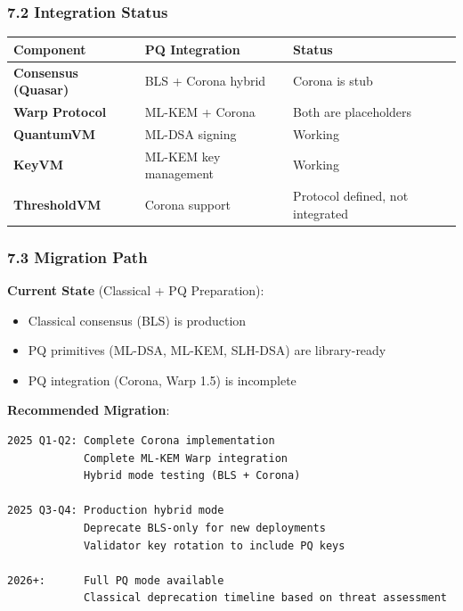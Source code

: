 \documentclass[
]{article}
\newcounter{none} %
\providecommand{\tightlist}{%
  \setlength{\itemsep}{0pt}\setlength{\parskip}{0pt}}
\begin{document}
\subsubsection{7.2 Integration Status}\label{72-integration-status}

{\def\LTcaptype{none} %
\begin{longtable}[]{@{}lll@{}}
\toprule\noalign{}
Component & PQ Integration & Status \\
\midrule\noalign{}
\endhead
\bottomrule\noalign{}
\endlastfoot
\textbf{Consensus (Quasar)} & BLS + Corona hybrid & Corona is
stub \\
\textbf{Warp Protocol} & ML-KEM + Corona & Both are placeholders \\
\textbf{QuantumVM} & ML-DSA signing & Working \\
\textbf{KeyVM} & ML-KEM key management & Working \\
\textbf{ThresholdVM} & Corona support & Protocol defined, not
integrated \\
\end{longtable}
}

\subsubsection{7.3 Migration Path}\label{73-migration-path}

\textbf{Current State} (Classical + PQ Preparation):

\begin{itemize}
\tightlist
\item
  Classical consensus (BLS) is production
\item
  PQ primitives (ML-DSA, ML-KEM, SLH-DSA) are library-ready
\item
  PQ integration (Corona, Warp 1.5) is incomplete
\end{itemize}

\textbf{Recommended Migration}:

\begin{verbatim}
2025 Q1-Q2: Complete Corona implementation
            Complete ML-KEM Warp integration
            Hybrid mode testing (BLS + Corona)

2025 Q3-Q4: Production hybrid mode
            Deprecate BLS-only for new deployments
            Validator key rotation to include PQ keys

2026+:      Full PQ mode available
            Classical deprecation timeline based on threat assessment
\end{verbatim}
\end{document}
